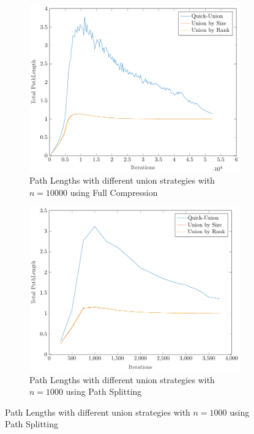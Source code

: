 \begin{figure}[ht]
\begin{subfigure}{0.32\textwidth}
    \end{subfigure}%
    \hfill
    \begin{subfigure}{0.32\textwidth}
        \centering
        \includegraphics[width=\textwidth]{../images/plotFCFull10000_PathLength.pdf}
        \caption{Path Lengths with different union strategies with $n = 10000$ using Full Compression}
    \end{subfigure}
    \begin{subfigure}{0.32\textwidth}
        \centering
        \includegraphics[width=\textwidth]{../images/plotPSFull1000_PathLength.pdf}
        \caption{Path Lengths with different union strategies with $n = 1000$ using Path Splitting}

\end{subfigure}
\end{figure}
